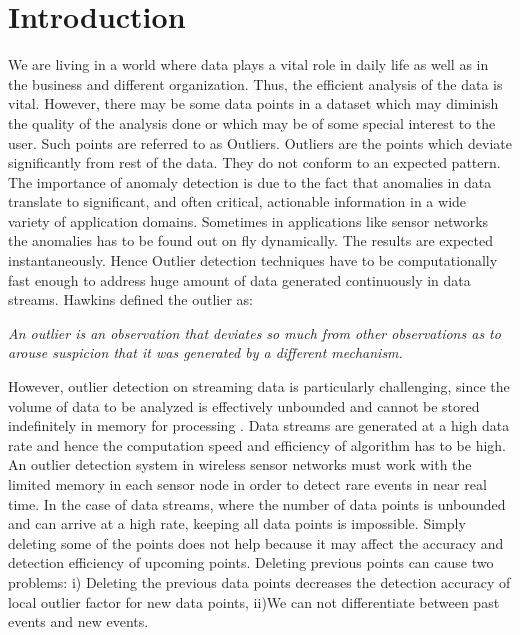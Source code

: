 \chapter{Introduction}

We are living in a world where data plays a vital role in daily life as well as in the
business and different organization. Thus, the efficient analysis of the data is vital.
However, there may be some data points in a dataset which may diminish the quality
of the analysis done or which may be of some special interest to the user. Such
points are referred to as Outliers. Outliers are the points which deviate significantly from rest of the data. They do not conform to an expected pattern. The importance of anomaly detection is due to the fact that anomalies in data translate
to significant, and often critical, actionable information in a wide variety of application
domains. Sometimes in applications like sensor networks the anomalies has to be found out on fly dynamically. The results are expected instantaneously. Hence Outlier detection techniques have to be computationally fast enough to address huge amount of data generated continuously in data streams.  Hawkins
\cite{hawkins} defined the outlier as:

\par 
\textit{An outlier is an observation that deviates so much from other observations as to
	arouse suspicion that it was generated by a different mechanism.}
 
	 However, outlier detection on streaming data is particularly
challenging, since the volume of data to be analyzed is
effectively unbounded and cannot be stored indefinitely in
memory for processing \cite{c}. Data streams are generated at a high data rate and hence the computation speed and efficiency of algorithm has to be high. An outlier detection system in wireless sensor
networks must work with the limited memory in each
sensor node in order to detect rare events in near real time. In the
case of data streams, where the number of data points is
unbounded and can arrive at a high rate, keeping all data
points is impossible. Simply deleting some of the points does not help because it may affect the accuracy and detection efficiency of upcoming points. Deleting previous points can cause two problems: i) Deleting the previous data points decreases the detection accuracy of local outlier factor for new data points, ii)We can not differentiate between past events and new events. 


